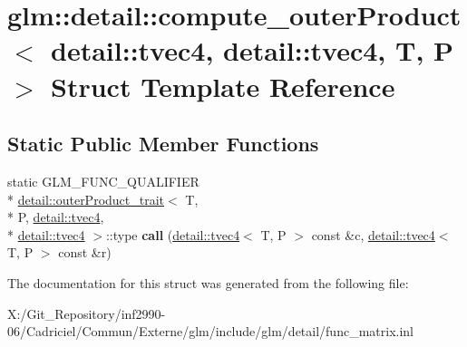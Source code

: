 \hypertarget{structglm_1_1detail_1_1compute__outer_product_3_01detail_1_1tvec4_00_01detail_1_1tvec4_00_01_t_00_01_p_01_4}{\section{glm\-:\-:detail\-:\-:compute\-\_\-outer\-Product$<$ detail\-:\-:tvec4, detail\-:\-:tvec4, T, P $>$ Struct Template Reference}
\label{structglm_1_1detail_1_1compute__outer_product_3_01detail_1_1tvec4_00_01detail_1_1tvec4_00_01_t_00_01_p_01_4}
}
\subsection*{Static Public Member Functions}
\begin{DoxyCompactItemize}
\item 
\hypertarget{structglm_1_1detail_1_1compute__outer_product_3_01detail_1_1tvec4_00_01detail_1_1tvec4_00_01_t_00_01_p_01_4_a36b56551c89be331014bca9ffc0a856e}{static G\-L\-M\-\_\-\-F\-U\-N\-C\-\_\-\-Q\-U\-A\-L\-I\-F\-I\-E\-R \\*
\hyperlink{structglm_1_1detail_1_1outer_product__trait}{detail\-::outer\-Product\-\_\-trait}$<$ T, \\*
P, \hyperlink{structglm_1_1detail_1_1tvec4}{detail\-::tvec4}, \\*
\hyperlink{structglm_1_1detail_1_1tvec4}{detail\-::tvec4} $>$\-::type {\bfseries call} (\hyperlink{structglm_1_1detail_1_1tvec4}{detail\-::tvec4}$<$ T, P $>$ const \&c, \hyperlink{structglm_1_1detail_1_1tvec4}{detail\-::tvec4}$<$ T, P $>$ const \&r)}\label{structglm_1_1detail_1_1compute__outer_product_3_01detail_1_1tvec4_00_01detail_1_1tvec4_00_01_t_00_01_p_01_4_a36b56551c89be331014bca9ffc0a856e}

\end{DoxyCompactItemize}


The documentation for this struct was generated from the following file\-:\begin{DoxyCompactItemize}
\item 
X\-:/\-Git\-\_\-\-Repository/inf2990-\/06/\-Cadriciel/\-Commun/\-Externe/glm/include/glm/detail/func\-\_\-matrix.\-inl\end{DoxyCompactItemize}
